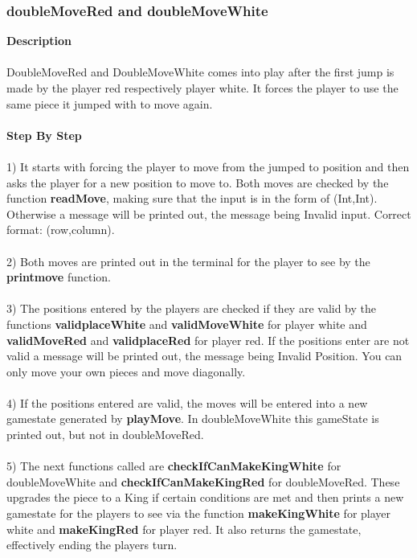 \documentclass[12pt,a4paper]{article}
\begin{document}
{\subsubsection{doubleMoveRed and doubleMoveWhite}}
\textbf{Description}\\\\ DoubleMoveRed and DoubleMoveWhite comes into play after the first jump is made by the player red respectively player white. It forces the player to use the same piece it jumped with to move again.\\\\
\textbf{Step By Step}\\\\
1) It starts with forcing the player to move from the jumped to position and then asks the player for a new position to move to. Both moves are checked by the function {\textbf{\small{readMove}}}, making sure that the input is in the form of (Int,Int). Otherwise a message will be printed out, the message being Invalid input. Correct format: (row,column).\\\\
2) Both moves are printed out in the terminal for the player to see by the {\textbf{\small{printmove}}} function. \\\\
3) The positions entered by the players are checked if they are valid by the functions {\textbf{\small{validplaceWhite}}} and {\textbf{\small{validMoveWhite}}} for player white and {\textbf{\small{validMoveRed}}} and {\textbf{\small{validplaceRed}}} for player red. If the positions enter are not valid a message will be printed out, the message being Invalid Position. You can only move your own pieces and move diagonally.\\\\
4) If the positions entered are valid, the moves will be entered into a new gamestate generated by {\textbf{\small{playMove}}}. In doubleMoveWhite this gameState is printed out, but not in doubleMoveRed.\\\\
5) The next functions called are {\textbf{\small{checkIfCanMakeKingWhite}}} for doubleMoveWhite and {\textbf{\small{checkIfCanMakeKingRed}}}   for doubleMoveRed. These upgrades the piece to a King if certain conditions are met and then prints a new gamestate for the players to see via the function {\textbf{\small{makeKingWhite}}} for player white and {\textbf{\small{makeKingRed}}} for player red. It also returns the gamestate, effectively ending the players turn.\\\\
\end{document}
